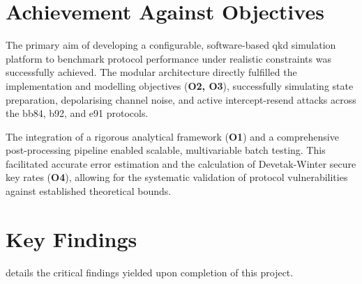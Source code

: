 \documentclass[11pt, a4paper]{report}
\begin{document}
\section{Achievement Against Objectives}
\label{sec:achievements}

The primary aim of developing a configurable, software-based \gls{qkd} simulation platform to benchmark protocol performance under realistic constraints was successfully achieved. The modular architecture directly fulfilled the implementation and modelling objectives (\textbf{O2, O3}), successfully simulating state preparation, depolarising channel noise, and active intercept-resend attacks across the \gls{bb84}, \gls{b92}, and \gls{e91} protocols. 

The integration of a rigorous analytical framework (\textbf{O1}) and a comprehensive post-processing pipeline enabled scalable, multivariable batch testing. This facilitated accurate error estimation and the calculation of Devetak-Winter secure key rates (\textbf{O4}), allowing for the systematic validation of protocol vulnerabilities against established theoretical bounds.


\section{Key Findings}
\label{sec:key}

 details the critical findings yielded upon completion of this project.
\end{document}
